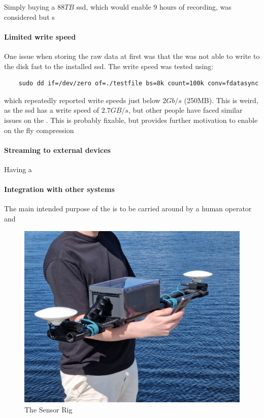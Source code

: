 Simply buying a 8$8TB$ \gls{ssd}, which would enable 9 hours of recording, was considered but s\cite{CorsairMP600PRO}

\cite{microntechnologyMicron2300SSD2020}

\paragraph{Limited write speed}
One issue when storing the raw data at first was that the \jx was not able to write to the disk fast to the installed \gls{ssd}.
The write speed was tested using:
\begin{verbatim}
    sudo dd if=/dev/zero of=./testfile bs=8k count=100k conv=fdatasync
\end{verbatim}
which repeatedly reported write speeds just below $2Gb/s$ (250MB).
This is weird, as the \gls{ssd} has a write speed of $2.7GB/s$, but other people have faced similar issues on the \jx \cite{microntechnologyMicron2300SSD2020} \cite{dtyuImbalancedPerformanceRead2018}.
This is probably fixable, but provides further motivation to enable on the fly compression

\paragraph{Streaming to external devices}
Having a

\paragraph{Integration with other systems}
The main intended purpose of the \sr is to be carried around by a human operator and


\begin{figure}[H]
    \includegraphics[width=\textwidth]{figures/frontpage.jpg}
    \caption{The Sensor Rig}
\end{figure}


